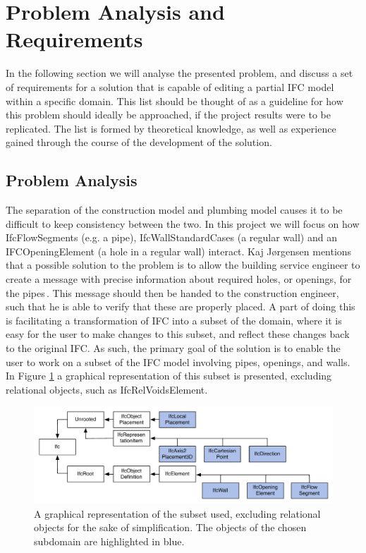 \section{Problem Analysis and Requirements}
In the following section we will analyse the presented problem, and discuss a set of requirements for a solution that is capable of editing a partial IFC model within a specific domain. This list should be thought of as a guideline for how this problem should ideally be approached, if the project results were to be replicated. The list is formed by theoretical knowledge, as well as experience gained through the course of the development of the solution.

\subsection{Problem Analysis}
\label{subsec:problem_analysis}
The separation of the construction model and plumbing model causes it to be difficult to keep consistency between the two. In this project we will focus on how IfcFlowSegments (e.g. a pipe), IfcWallStandardCases (a regular wall) and an IFCOpeningElement (a hole in a regular wall) interact. Kaj Jørgensen mentions that a possible solution to the problem is to allow the building service engineer to create a message with precise information about required holes, or openings, for the pipes\,\cite{jorgensen12}. This message should then be handed to the construction engineer, such that he is able to verify that these are properly placed. A part of doing this is facilitating a transformation of IFC into a subset of the domain, where it is easy for the user to make changes to this subset, and reflect these changes back to the original IFC. As such, the primary goal of the solution is to enable the user to work on a subset of the IFC model involving pipes, openings, and walls. In Figure \ref{fig:ifcheirachy} a graphical representation of this subset is presented, excluding relational objects, such as IfcRelVoidsElement.

\begin{figure}[t]
    \centering
        \includegraphics[width=120mm]{images/IfcHeirachy.pdf}
    \caption{A graphical representation of the subset used, excluding relational objects for the sake of simplification. The objects of the chosen subdomain are highlighted in blue.}
    \label{fig:ifcheirachy}
\end{figure}

